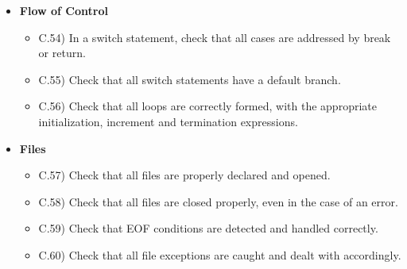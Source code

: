 \documentclass[../../codeInspection.tex]{subfiles}
\begin{document}
\begin{itemize}
				\item 	\textbf{Flow of Control}
						\begin{itemize}

							\item C.54) In a switch statement, check that all cases are addressed by break or return.

							\item C.55) Check that all switch statements have a default branch.

							\item C.56) Check that all loops are correctly formed, with the appropriate initialization, increment and termination expressions.

						\end{itemize}

				\item 	\textbf{Files}
						\begin{itemize}

							\item C.57) Check that all files are properly declared and opened.

							\item C.58) Check that all files are closed properly, even in the case of an error.

							\item C.59) Check that EOF conditions are detected and handled correctly.

							\item C.60) Check that all file exceptions are caught and dealt with accordingly.
							
						\end{itemize}
			\end{itemize}
\end{document}
